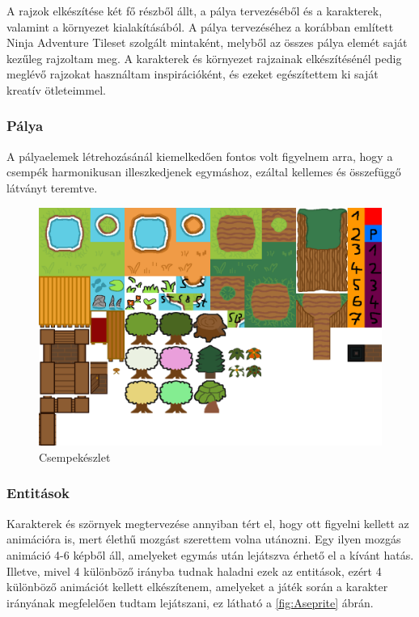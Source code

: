 \indent \indent A rajzok elkészítése két fő részből állt, a pálya tervezéséből és a karakterek, valamint a környezet kialakításából. A pálya tervezéséhez a korábban említett Ninja Adventure Tileset szolgált mintaként, melyből az összes pálya elemét saját kezűleg rajzoltam meg. A karakterek és környezet rajzainak elkészítésénél pedig meglévő rajzokat használtam inspirációként, és ezeket egészítettem ki saját kreatív ötleteimmel.

\subsubsection{Pálya}
\indent \indent A pályaelemek létrehozásánál kiemelkedően fontos volt figyelnem arra, hogy a csempék harmonikusan illeszkedjenek egymáshoz, ezáltal kellemes és összefüggő látványt teremtve.

\begin{figure}[H]
    \centering
    \includegraphics[width=12.0truecm]{images/tileset.png}
    \caption{Csempekészlet}
    \label{fig:Csempekészlet}
\end{figure}

\subsubsection{Entitások}
\indent \indent Karakterek és szörnyek megtervezése annyiban tért el, hogy ott figyelni kellett az animációra is, mert élethű mozgást szerettem volna utánozni. Egy ilyen mozgás animáció 4-6 képből áll, amelyeket egymás után lejátszva érhető el a kívánt hatás. Illetve, mivel 4 különböző irányba tudnak haladni ezek az entitások, ezért 4 különböző animációt kellett elkészítenem, amelyeket a játék során a karakter irányának megfelelően tudtam lejátszani, ez látható a \ref{fig:Aseprite} ábrán.

